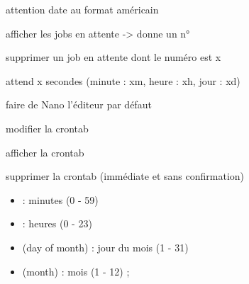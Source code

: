 \documentclass[letterpaper,10pt,french]{sphinxmanual}
\begin{document}
\begin{description}
\item[{}] \leavevmode
attention date au format américain

\end{description}

\begin{description}
\item[{}] \leavevmode
afficher les jobs en attente -\textgreater{} donne un n°

\item[{}] \leavevmode
supprimer un job en attente dont le numéro est x

\item[{}] \leavevmode
attend x secondes (minute : xm, heure : xh, jour : xd)

\item[{}] \leavevmode
faire de Nano l’éditeur par défaut

\item[{}] \leavevmode
modifier la crontab

\item[{}] \leavevmode
afficher la crontab

\item[{}] \leavevmode
supprimer la crontab (immédiate et sans confirmation)

\item[{}] \leavevmode\begin{itemize}
\item {} 
 : minutes (0 - 59)

\item {} 
 : heures (0 - 23)

\item {} 
 (day of month) : jour du mois (1 - 31)

\item {} 
 (month) : mois (1 - 12) ;


\end{itemize}
\end{description}
\end{document}
